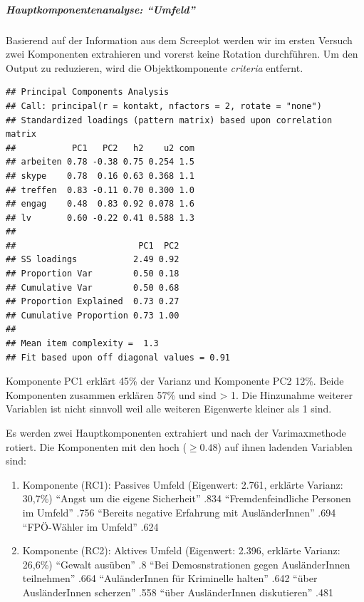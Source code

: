 \documentclass[]{article}
\newenvironment{Shaded}{\begin{snugshade}}{\end{snugshade}}
\newcommand{\KeywordTok}[1]{\textcolor[rgb]{0.13,0.29,0.53}{\textbf{{#1}}}}
\newcommand{\DataTypeTok}[1]{\textcolor[rgb]{0.13,0.29,0.53}{{#1}}}
\newcommand{\DecValTok}[1]{\textcolor[rgb]{0.00,0.00,0.81}{{#1}}}
\newcommand{\StringTok}[1]{\textcolor[rgb]{0.31,0.60,0.02}{{#1}}}
\newcommand{\OtherTok}[1]{\textcolor[rgb]{0.56,0.35,0.01}{{#1}}}
\newcommand{\NormalTok}[1]{{#1}}
\providecommand{\tightlist}{%
  \setlength{\itemsep}{0pt}\setlength{\parskip}{0pt}}
\let\oldsubparagraph\subparagraph
\renewcommand{\subparagraph}[1]{\oldsubparagraph{#1}\mbox{}}
\begin{document}
\subparagraph{\texorpdfstring{Hauptkomponentenanalyse:
``Umfeld''}{Hauptkomponentenanalyse: Umfeld}}\label{hauptkomponentenanalyse-umfeld-1}

Basierend auf der Information aus dem Screeplot werden wir im ersten
Versuch zwei Komponenten extrahieren und vorerst keine Rotation
durchführen. Um den Output zu reduzieren, wird die Objektkomponente
\emph{criteria} entfernt.

\begin{Shaded}
\end{Shaded}

\begin{verbatim}
## Principal Components Analysis
## Call: principal(r = kontakt, nfactors = 2, rotate = "none")
## Standardized loadings (pattern matrix) based upon correlation matrix
##           PC1   PC2   h2    u2 com
## arbeiten 0.78 -0.38 0.75 0.254 1.5
## skype    0.78  0.16 0.63 0.368 1.1
## treffen  0.83 -0.11 0.70 0.300 1.0
## engag    0.48  0.83 0.92 0.078 1.6
## lv       0.60 -0.22 0.41 0.588 1.3
## 
##                        PC1  PC2
## SS loadings           2.49 0.92
## Proportion Var        0.50 0.18
## Cumulative Var        0.50 0.68
## Proportion Explained  0.73 0.27
## Cumulative Proportion 0.73 1.00
## 
## Mean item complexity =  1.3
## Fit based upon off diagonal values = 0.91
\end{verbatim}

Komponente PC1 erklärt 45\% der Varianz und Komponente PC2 12\%. Beide
Komponenten zusammen erklären 57\% und sind \textgreater{} 1. Die
Hinzunahme weiterer Variablen ist nicht sinnvoll weil alle weiteren
Eigenwerte kleiner als 1 sind.

Es werden zwei Hauptkomponenten extrahiert und nach der Varimaxmethode
rotiert. Die Komponenten mit den hoch (\(\ge 0.48\)) auf ihnen ladenden
Variablen sind:

\begin{enumerate}
\def\labelenumi{\arabic{enumi}.}
\tightlist
\item
  Komponente (RC1): Passives Umfeld (Eigenwert: 2.761, erklärte Varianz:
  30,7\%) ``Angst um die eigene Sicherheit'' .834 ``Fremdenfeindliche
  Personen im Umfeld'' .756 ``Bereits negative Erfahrung mit
  AusländerInnen'' .694 ``FPÖ-Wähler im Umfeld'' .624
\item
  Komponente (RC2): Aktives Umfeld (Eigenwert: 2.396, erklärte Varianz:
  26,6\%) ``Gewalt ausüben'' .8 ``Bei Demosnstrationen gegen
  AusländerInnen teilnehmen'' .664 ``AuländerInnen für Kriminelle
  halten'' .642 ``über AusländerInnen scherzen'' .558 ``über
  AusländerInnen diskutieren'' .481
\end{enumerate}
\end{document}
